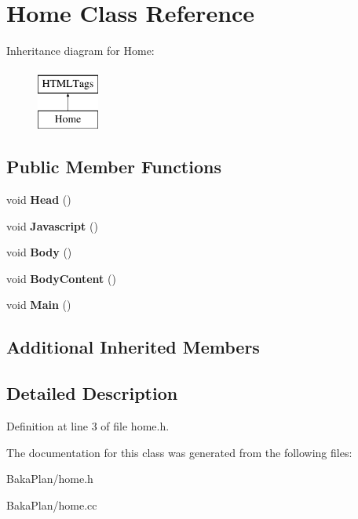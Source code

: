 \hypertarget{classHome}{\section{Home Class Reference}
\label{classHome}
}
Inheritance diagram for Home\-:\begin{figure}[H]
\begin{center}
\leavevmode
\includegraphics[height=2.000000cm]{classHome}
\end{center}
\end{figure}
\subsection*{Public Member Functions}
\begin{DoxyCompactItemize}
\item 
\hypertarget{classHome_aa327c2af7868c60c181806734e3b00f6}{void {\bfseries Head} ()}\label{classHome_aa327c2af7868c60c181806734e3b00f6}

\item 
\hypertarget{classHome_aa603fee7511d68025346d1e7fed09e80}{void {\bfseries Javascript} ()}\label{classHome_aa603fee7511d68025346d1e7fed09e80}

\item 
\hypertarget{classHome_a008d316a2ff266216dffc74042b6bd25}{void {\bfseries Body} ()}\label{classHome_a008d316a2ff266216dffc74042b6bd25}

\item 
\hypertarget{classHome_ab4cc0a979a58aea15ffdf20517b8f4e4}{void {\bfseries Body\-Content} ()}\label{classHome_ab4cc0a979a58aea15ffdf20517b8f4e4}

\item 
\hypertarget{classHome_aaecd93781c4fa1bd9d7a287c929be2fd}{void {\bfseries Main} ()}\label{classHome_aaecd93781c4fa1bd9d7a287c929be2fd}

\end{DoxyCompactItemize}
\subsection*{Additional Inherited Members}


\subsection{Detailed Description}


Definition at line 3 of file home.\-h.



The documentation for this class was generated from the following files\-:\begin{DoxyCompactItemize}
\item 
Baka\-Plan/home.\-h\item 
Baka\-Plan/home.\-cc\end{DoxyCompactItemize}
